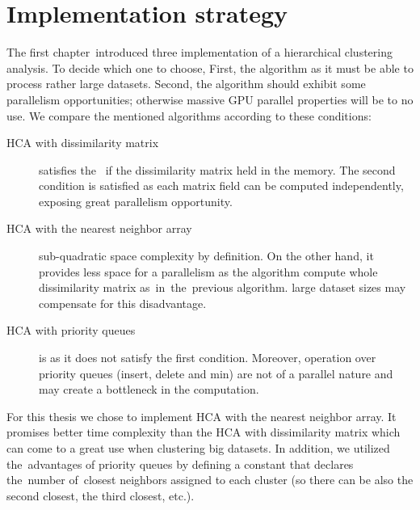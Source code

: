 \section{Implementation strategy}

The first chapter\ introduced three  implementation of a hierarchical clustering analysis. To decide which one to choose,  First, the algorithm  as it must be able to process rather large datasets. Second, the algorithm should exhibit some parallelism opportunities; otherwise massive GPU parallel properties will be to no use.  We compare the mentioned algorithms according to these conditions:


\begin{description}

\item[HCA with dissimilarity matrix] satisfies the \ if the dissimilarity matrix  held in the memory. The second condition is satisfied as each matrix field can be computed independently, exposing great parallelism opportunity. 

\item[HCA with the nearest neighbor array]  sub-quadratic space complexity by definition. On the other hand, it provides less space for a parallelism as the algorithm  compute whole dissimilarity matrix as~in~the~previous algorithm.  large dataset sizes may compensate for this disadvantage. 

\item[HCA with priority queues] is  as it does not satisfy the first condition. Moreover, operation over priority queues (insert, delete and min) are not of a parallel nature and may create a bottleneck in the computation.

\end{description}

For this thesis we chose to implement HCA with the nearest neighbor array. It promises better time complexity than the HCA with dissimilarity matrix which can come to a great use when clustering big datasets. In addition, we utilized the~advantages of priority queues by defining a constant that declares the~number of~closest neighbors assigned to each cluster (so there can be also the second closest, the third closest, etc.).

